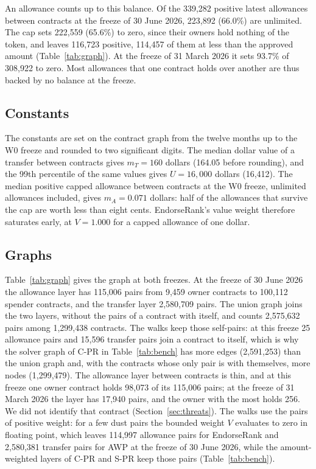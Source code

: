 \documentclass{ieeeaccess}
\newcommand{\cpr}{\mbox{C-PR}}
\newcommand{\spr}{\mbox{S-PR}}
\begin{document}
An allowance counts up to this balance. Of the 339,282 positive latest allowances between contracts at the freeze of 30 June 2026, 223,892 (66.0\%) are unlimited. The cap sets 222,559 (65.6\%) to zero, since their owners hold nothing of the token, and leaves 116,723 positive, 114,457 of them at less than the approved amount (Table~\ref{tab:graph}). At the freeze of 31 March 2026 it sets 93.7\% of 308,922 to zero. Most allowances that one contract holds over another are thus backed by no balance at the freeze.

\subsection{Constants}
\label{sec:constants}
The constants are set on the contract graph from the twelve months up to the W0 freeze and rounded to two significant digits. The median dollar value of a transfer between contracts gives $m_T=160$ dollars (164.05 before rounding), and the 99th percentile of the same values gives $U=16{,}000$ dollars (16,412). The median positive capped allowance between contracts at the W0 freeze, unlimited allowances included, gives $m_A=0.071$ dollars: half of the allowances that survive the cap are worth less than eight cents. EndorseRank's value weight therefore saturates early, at $V=1.000$ for a capped allowance of one dollar.

\subsection{Graphs}
\label{sec:graphs}
Table~\ref{tab:graph} gives the graph at both freezes. At the freeze of 30 June 2026 the allowance layer has 115,006 pairs from 9,459 owner contracts to 100,112 spender contracts, and the transfer layer 2,580,709 pairs. The union graph joins the two layers, without the pairs of a contract with itself, and counts 2,575,632 pairs among 1,299,438 contracts. The walks keep those self-pairs: at this freeze 25 allowance pairs and 15,596 transfer pairs join a contract to itself, which is why the solver graph of \cpr{} in Table~\ref{tab:bench} has more edges (2,591,253) than the union graph and, with the contracts whose only pair is with themselves, more nodes (1,299,479). The allowance layer between contracts is thin, and at this freeze one owner contract holds 98,073 of its 115,006 pairs; at the freeze of 31 March 2026 the layer has 17,940 pairs, and the owner with the most holds 256. We did not identify that contract (Section~\ref{sec:threats}). The walks use the pairs of positive weight: for a few dust pairs the bounded weight $V$ evaluates to zero in floating point, which leaves 114,997 allowance pairs for EndorseRank and 2,580,381 transfer pairs for AWP at the freeze of 30 June 2026, while the amount-weighted layers of \cpr{} and \spr{} keep those pairs (Table~\ref{tab:bench}).
\end{document}
